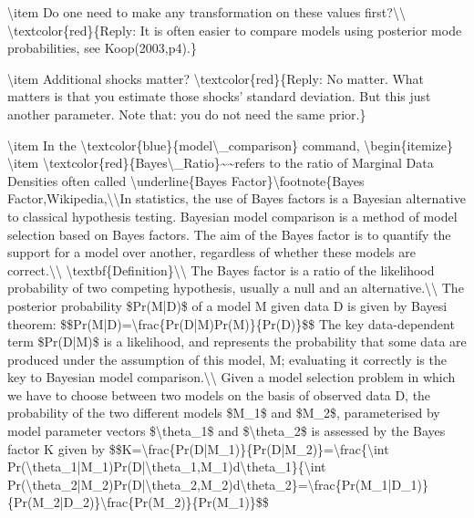 \documentclass[10pt,math=newtx,citestyle=gb7714-2015,bibstyle=gb7714-2015]{elegantbook}
\begin{document}
	
	\textbackslash{}item Do one need to make any transformation on these values first?\textbackslash{}\textbackslash{}
	\textbackslash{}textcolor\{red\}\{Reply: It is often easier to compare models using posterior mode probabilities, see Koop(2003,p4).\}
	
	\textbackslash{}item Additional shocks matter?
	\textbackslash{}textcolor\{red\}\{Reply: No matter. What matters is that you estimate those shocks' standard deviation. But this just another parameter. Note that: you do not need the same prior.\}
	
	\textbackslash{}item In the \textbackslash{}textcolor\{blue\}\{model\textbackslash{}\_comparison\} command,
	\textbackslash{}begin\{itemize\}
	\textbackslash{}item \textbackslash{}textcolor\{red\}\{Bayes\textbackslash{}\_Ratio\}\~{}\~{}refers to the ratio of Marginal Data Densities often called \textbackslash{}underline\{Bayes Factor\}\textbackslash{}footnote\{Bayes Factor,Wikipedia,\textbackslash{}\textbackslash{}In statistics, the use of Bayes factors is a Bayesian alternative to classical hypothesis testing. Bayesian model comparison is a method of model selection based on Bayes factors. The aim of the Bayes factor is to quantify the support for a model over another, regardless of whether these models are correct.\textbackslash{}\textbackslash{}
	\textbackslash{}textbf\{Definition\}\textbackslash{}\textbackslash{}
	The Bayes factor is a ratio of the likelihood probability of two competing hypothesis, usually a null and an alternative.\textbackslash{}\textbackslash{}
	The posterior probability \$Pr(M|D)\$ of a model M given data D is given by Bayesi theorem:
	\$\$Pr(M|D)=\textbackslash{}frac\{Pr(D|M)Pr(M)\}\{Pr(D)\}\$\$
	The key data-dependent term \$Pr(D|M)\$ is a likelihood, and represents the probability that some data are produced under the assumption of this model, M; evaluating it correctly is the key to Bayesian model comparison.\textbackslash{}\textbackslash{}
	Given a model selection problem in which we have to choose between two models on the basis of observed data D, the probability of the two different models \$M\_1\$ and \$M\_2\$, parameterised by model parameter vectors \$\textbackslash{}theta\_1\$ and \$\textbackslash{}theta\_2\$ is assessed by the Bayes factor K given by
	\$\$K=\textbackslash{}frac\{Pr(D|M\_1)\}\{Pr(D|M\_2)\}=\textbackslash{}frac\{\textbackslash{}int Pr(\textbackslash{}theta\_1|M\_1)Pr(D|\textbackslash{}theta\_1,M\_1)d\textbackslash{}theta\_1\}\{\textbackslash{}int Pr(\textbackslash{}theta\_2|M\_2)Pr(D|\textbackslash{}theta\_2,M\_2)d\textbackslash{}theta\_2\}=\textbackslash{}frac\{Pr(M\_1|D\_1)\}\{Pr(M\_2|D\_2)\}\textbackslash{}frac\{Pr(M\_2)\}\{Pr(M\_1)\}\$\$
\end{document}
